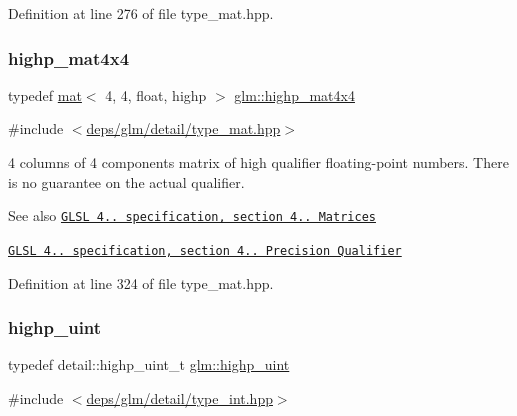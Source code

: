 Definition at line 276 of file type\+\_\+mat.\+hpp.

\mbox{\label{group__core__precision_ga93c7db376e7b0bd24ef4947667468c9a}} 
\subsubsection{\texorpdfstring{highp\+\_\+mat4x4}{highp\_mat4x4}}
{\footnotesize\ttfamily typedef \hyperlink{structglm_1_1mat}{mat}$<$ 4, 4, float, highp $>$ \hyperlink{group__core__precision_ga93c7db376e7b0bd24ef4947667468c9a}{glm\+::highp\+\_\+mat4x4}}



{\ttfamily \#include $<$\hyperlink{type__mat_8hpp}{deps/glm/detail/type\+\_\+mat.\+hpp}$>$}

4 columns of 4 components matrix of high qualifier floating-\/point numbers. There is no guarantee on the actual qualifier.

\begin{DoxySeeAlso}{See also}
\href{http://www.opengl.org/registry/doc/GLSLangSpec.4.20.8.pdf}{\tt G\+L\+SL 4.. specification, section 4.. Matrices} 

\href{http://www.opengl.org/registry/doc/GLSLangSpec.4.20.8.pdf}{\tt G\+L\+SL 4.. specification, section 4.. Precision Qualifier} 
\end{DoxySeeAlso}


Definition at line 324 of file type\+\_\+mat.\+hpp.

\mbox{\label{group__core__precision_gabfd1cf11193324a5f77d3831b6ac3205}} 
\subsubsection{\texorpdfstring{highp\+\_\+uint}{highp\_uint}}
{\footnotesize\ttfamily typedef detail\+::highp\+\_\+uint\+\_\+t \hyperlink{group__core__precision_gabfd1cf11193324a5f77d3831b6ac3205}{glm\+::highp\+\_\+uint}}



{\ttfamily \#include $<$\hyperlink{type__int_8hpp}{deps/glm/detail/type\+\_\+int.\+hpp}$>$}

